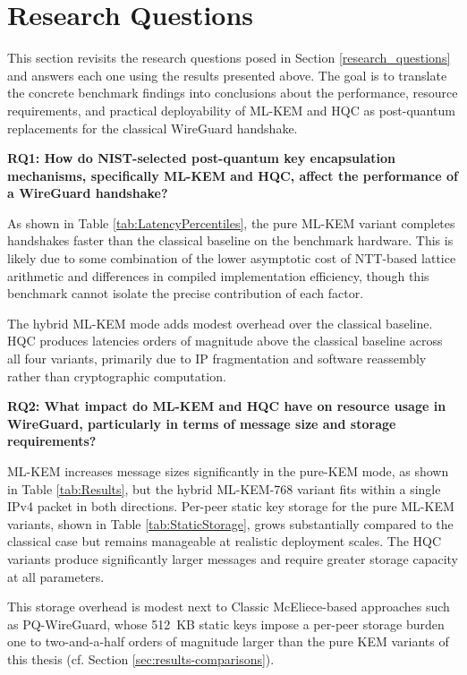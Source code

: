 \section{Research Questions}\label{sec:results-rq} 
This section revisits the research questions posed in Section \ref{research_questions} and answers each one using the results presented above. The goal is to translate the concrete benchmark findings into conclusions about the performance, resource requirements, and practical deployability of ML-KEM and HQC as post-quantum replacements for the classical WireGuard handshake.

\textbf{RQ1: How do NIST-selected post-quantum key encapsulation mechanisms, specifically ML-KEM and HQC, affect the performance of a WireGuard handshake?}

As shown in Table \ref{tab:LatencyPercentiles}, the pure ML-KEM variant completes handshakes faster than the classical baseline on the benchmark hardware. This is likely due to some combination of the lower asymptotic cost of NTT-based lattice arithmetic and differences in compiled implementation efficiency, though this benchmark cannot isolate the precise contribution of each factor.

The hybrid ML-KEM mode adds modest overhead over the classical baseline. HQC produces latencies orders of magnitude above the classical baseline across all four variants, primarily due to IP fragmentation and software reassembly rather than cryptographic computation.

\textbf{RQ2: What impact do ML-KEM and HQC have on resource usage in WireGuard, particularly in terms of message size and storage requirements?}

ML-KEM increases message sizes significantly in the pure-KEM mode, as shown in Table \ref{tab:Results}, but the hybrid ML-KEM-768 variant fits within a single IPv4 packet in both directions. Per-peer static key storage for the pure ML-KEM variants, shown in Table \ref{tab:StaticStorage}, grows substantially compared to the classical case but remains manageable at realistic deployment scales. The HQC variants produce significantly larger messages and require greater storage capacity at all parameters. 

This storage overhead is modest next to Classic McEliece-based approaches such as PQ-WireGuard, whose \qty{512}{KB} static keys impose a per-peer storage burden one to two-and-a-half orders of magnitude larger than the pure KEM variants of this thesis (cf. Section \ref{sec:results-comparisons}).


